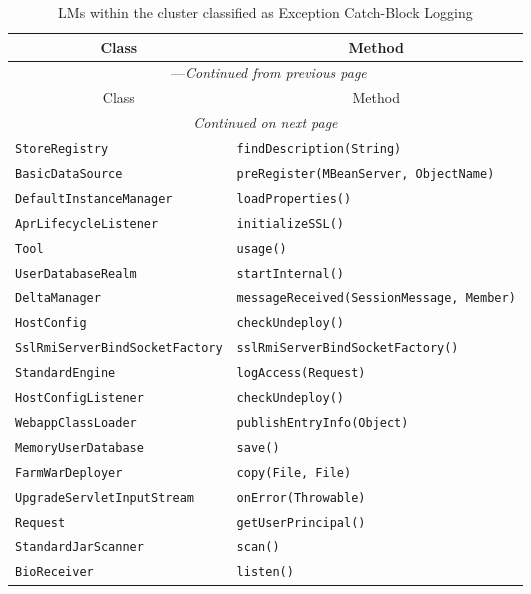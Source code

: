 \begin{center}
\begin{longtable}{ll}
\caption{LMs within the cluster classified as Exception Catch-Block Logging}\\
\toprule\multicolumn{1}{c}{Class}&\multicolumn{1}{c}{Method}\\\midrule
\endfirsthead

\multicolumn{2}{c}{\tablename\ \thetable{}---\textit{Continued from previous page}} \\\midrule
\multicolumn{1}{c}{Class}&\multicolumn{1}{c}{Method}\\\midrule
\endhead
\multicolumn{2}{c}{\textit{Continued on next page}}\\\midrule
\endfoot
\bottomrule
\endlastfoot
\lstinline/StoreRegistry/&{\lstinline/findDescription(String)/}\\
\lstinline/BasicDataSource/&{\lstinline/preRegister(MBeanServer, ObjectName)/}\\
\lstinline/DefaultInstanceManager/&{\lstinline/loadProperties()/}\\
\lstinline/AprLifecycleListener/&{\lstinline/initializeSSL()/}\\
\lstinline/Tool/&{\lstinline/usage()/}\\
\lstinline/UserDatabaseRealm/&{\lstinline/startInternal()/}\\
\lstinline/DeltaManager/&{\lstinline/messageReceived(SessionMessage, Member)/}\\
\lstinline/HostConfig/&{\lstinline/checkUndeploy()/}\\
\lstinline/SslRmiServerBindSocketFactory/&{\lstinline/sslRmiServerBindSocketFactory()/}\\
\lstinline/StandardEngine/&{\lstinline/logAccess(Request)/}\\
\lstinline/HostConfigListener/&{\lstinline/checkUndeploy()/}\\
\lstinline/WebappClassLoader/&{\lstinline/publishEntryInfo(Object)/}\\
\lstinline/MemoryUserDatabase/&{\lstinline/save()/}\\
\lstinline/FarmWarDeployer/&{\lstinline/copy(File, File)/}\\
\lstinline/UpgradeServletInputStream/&{\lstinline/onError(Throwable)/}\\
\lstinline/Request/&{\lstinline/getUserPrincipal()/}\\
\lstinline/StandardJarScanner/&{\lstinline/scan()/}\\
\lstinline/BioReceiver/&{\lstinline/listen()/}\\

\end{longtable}
\end{center}
